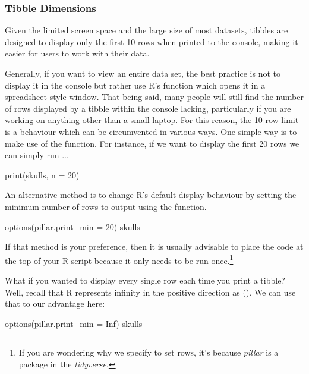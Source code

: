 \subsubsection{Tibble Dimensions}

Given the limited screen space and the large size of most datasets, tibbles are designed to display only the first 10 rows when printed to the console, making it easier for users to work with their data.

Generally, if you want to view an entire data set, the best practice is not to display it in the console but rather use R's  function which opens it in a spreadsheet-style window. That being said, many people will still find the number of rows displayed by a tibble within the console lacking, particularly if you are working on anything other than a small laptop. For this reason, the 10 row limit is a behaviour which can be circumvented in various ways. One simple way is to make use of the  function. For instance, if we want to display the first 20 rows we can simply run ...

\begin{inR}
print(skulls, n = 20)
\end{inR}

\vspace{1em}

An alternative method is to change R's default display behaviour by setting the minimum number of rows to output using the  function.

\begin{inR}
options(pillar.print_min = 20)
skulls
\end{inR}

\vspace{1em}

\noindent
If that method is your preference, then it is usually advisable to place the  code at the top of your R script because it only needs to be run once.\footnote{If you are wondering why we specify  to set rows, it's because \textit{pillar} is a package in the \textit{tidyverse}.}

What if you wanted to display every single row each time you print a tibble? Well, recall that R represents infinity in the positive direction as (). We can use that to our advantage here:

\begin{inR}
options(pillar.print_min = Inf)
skulls
\end{inR}

